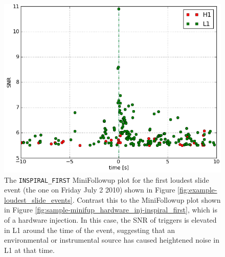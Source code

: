 \begin{figure}[p]
\center
\label{fig:sample-minifup_slide}
\includegraphics[width=4.8in]{figures/slide-loudest_events/H1L1-FULL_DATA_CAT_3_VETO_FULL_DATA_map-INSPIRAL_FIRST-3_LOUDEST_SLIDE_EVENTS_BY_COMBINED_FAR_SUMMARY-961545543-3628944.png}
\caption{The \texttt{INSPIRAL\_FIRST} MiniFollowup plot for the first loudest
slide event (the one on Friday July 2 2010) shown in Figure
\ref{fig:example-loudest_slide_events}. Contrast this to the MiniFollowup plot
shown in Figure \ref{fig:sample-minifup_hardware_inj-inspiral_first}, which is
of a hardware injection. In this case, the SNR of triggers is elevated in L1
around the time of the event, suggesting that an environmental or instrumental
source has caused heightened noise in L1 at that time.}
\end{figure}

